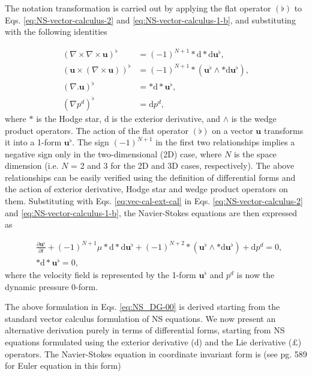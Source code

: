 \documentclass[final,12pt,times]{elsarticle}
\begin{document}
The notation transformation is carried out by applying the flat operator $(\flat)$ to Eqs. \eqref{eq:NS-vector-calculus-2} and \eqref{eq:NS-vector-calculus-1-b}, and substituting with the following identities

\begin{equation}
\begin{aligned}
\label{eq:vec-cal-ext-cal}
(\nabla \times \nabla \times \mathbf{u})^\flat &= (-1)^{N+1}  \ast \textrm{d} \ast \textrm{d} \mathbf{u}^\flat,  \\
(\mathbf{u} \times (\nabla \times \mathbf{u}))^\flat &= (-1)^{N+1}  \ast(\mathbf{u}^\flat \wedge \ast \textrm{d} \mathbf{u}^\flat),\\
(\nabla . \mathbf{u})^\flat &= \ast \textrm{d} \ast \mathbf{u}^\flat, \\
(\nabla p^d)^\flat &= \textrm{d}p^d, 
\end{aligned} 
\end{equation} 
where $\ast$ is the Hodge star, $\textrm{d}$ is the exterior derivative, and $\wedge$ is the wedge product operators. The action of the flat operator $(\flat)$ on a vector $\mathbf{u}$ transforms it into a 1-form $\mathbf{u}^\flat$. The sign $(-1)^{N+1}$ in the first two relationships implies a negative sign only in the two-dimensional (2D) case, where $N$ is the space dimension (i.e. $N$ = 2 and 3 for the 2D and 3D cases, respectively). The above relationships can be easily verified using the definition of differential forms and the action of exterior derivative, Hodge star and wedge product operators on them. Substituting with Eqs. \eqref{eq:vec-cal-ext-cal} in Eqs. \eqref{eq:NS-vector-calculus-2} and \eqref{eq:NS-vector-calculus-1-b}, the Navier-Stokes equations are then expressed as

\begin{subequations}
\label{eq:NS_DG-00}
\begin{align}
\label{eq:NS_DG-00-a}
&\frac{\partial \mathbf{u}^\flat}{\partial t} + (-1)^{N+1} \mu \ast \textrm{d} \ast \textrm{d} \mathbf{u}^\flat + (-1)^{N+2} \ast(\mathbf{u}^\flat \wedge \ast \textrm{d} \mathbf{u}^\flat) + \textrm{d}p^d =0,   \\
\label{eq:NS_DG-00-b}
&\ast \textrm{d} \ast \mathbf{u}^\flat = 0,
\end{align}
\end{subequations}
where the velocity field is represented by the 1-form $\mathbf{u}^\flat$ and $p^d$ is now the dynamic pressure 0-form.  

The above formulation in Eqs. \eqref{eq:NS_DG-00} is derived starting from the standard vector calculus formulation of NS equations. We now present an alternative derivation purely in terms of differential forms, starting from NS equations formulated using the exterior derivative ($\textrm{d}$) and the Lie derivative ($\pounds$) operators. The Navier-Stokes equation in coordinate invariant form is (see \cite{AbMaRa1988} pg. 589 for Euler equation in this form)
\end{document}
